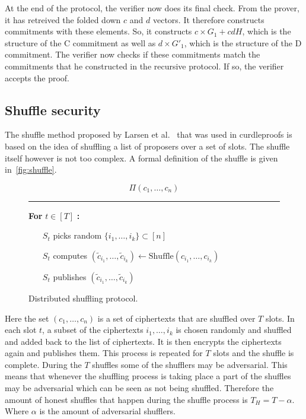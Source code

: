 At the end of the protocol, the verifier now does its final check.
From the prover, it has retreived the folded down $c$ and $d$ vectors.
It therefore constructs commitments with these elements.
So, it constructs $c\times G_1+cdH$, which is the structure of the C commitment as well as $d\times G'_1$, which is the structure of the D commitment.
The verifier now checks if these commitments match the commitments that he constructed in the recursive protocol.
If so, the verifier accepts the proof.


\subsection{Shuffle security}\label{sec:approach-shuffle-security}
The shuffle method proposed by Larsen et al.~\cite{cryptoeprint:2022/560} that was used in curdleproofs is based on the idea of shuffling a list of proposers over a set of slots.
The shuffle itself however is not too complex.
A formal definition of the shuffle is given in~\autoref{fig:shuffle}.

\begin{figure}[ht]
\begin{framed}
    \[
        \Pi(c_1, \ldots, c_n)
    \]
    \rule{\linewidth}{0.4pt}

    \noindent
    \textbf{For} $t \in [T]$ \textbf{:}
    \begin{itemize}
        \item[$S_t$] picks random $\{i_1, \ldots, i_k\} \subset [n]$
        \item[$S_t$] computes $(\tilde{c}_{i_1}, \ldots, \tilde{c}_{i_k}) \leftarrow \text{Shuffle}(c_{i_1}, \ldots, c_{i_k})$
        \item[$S_t$] publishes $(\tilde{c}_{i_1}, \ldots, \tilde{c}_{i_k})$
    \end{itemize}
\end{framed}
\caption{Distributed shuffling protocol.}
\label{fig:shuffle}
\end{figure}

Here the set $(c_1, \ldots, c_n)$ is a set of ciphertexts that are shuffled over $T$ slots.
In each slot $t$, a subset of the ciphertexts ${i_1, \ldots, i_k}$ is chosen randomly and shuffled and added back to the list of ciphertexts.
It is then encrypts the ciphertexts again and publishes them.
This process is repeated for $T$ slots and the shuffle is complete.
During the $T$ shuffles some of the shufflers may be adversarial.
This means that whenever the shuffling process is taking place a part of the shuffles may be adversarial which can be seen as not being shuffled.
Therefore the amount of honest shuffles that happen during the shuffle process is $T_H = T - \alpha$.
Where $\alpha$ is the amount of adversarial shufflers.

